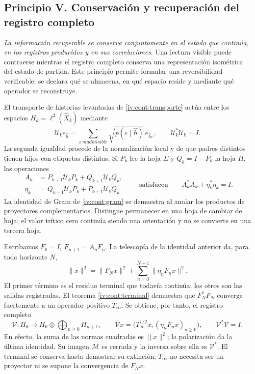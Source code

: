 \subsection*{Principio V. Conservación y recuperación del registro completo}
\hypertarget{prinh:conservacion}{}

\emph{La información recuperable se conserva conjuntamente en el estado
que continúa, en los registros producidos y en sus correlaciones.} Una
lectura visible puede contraerse mientras el registro completo conserva una
representación isométrica del estado de partida. Este principio permite
formular una reversibilidad verificable: se declara qué se almacena, en qué
espacio reside y mediante qué operador se reconstruye.

El transporte de historias levantadas de \cref{iv:cont:transporte} actúa
entre los espacios \(H_k=\ell^2(\widehat X_k)\) mediante
\[
 \mathcal U_ke_{\widehat h}=
 \sum_{\varepsilon\ {
m admisible}}
 \sqrt{p(\varepsilon\mid\widehat h)}\,
 e_{\widehat h\varepsilon},\qquad
 \mathcal U_k^*\mathcal U_k=I.
\]
La segunda igualdad procede de la normalización local y de que padres
distintos tienen hijos con etiquetas distintas. Si \(P_k\) lee la hoja
\(\Sigma\) y \(Q_k=I-P_k\) la hoja \(\Pi\), las operaciones
\[
 \begin{aligned}
 A_k&=P_{k+1}\mathcal U_kP_k+Q_{k+1}\mathcal U_kQ_k,\\
 \eta_k&=Q_{k+1}\mathcal U_kP_k+P_{k+1}\mathcal U_kQ_k
 \end{aligned}
 \qquad\text{satisfacen}\qquad A_k^*A_k+\eta_k^*\eta_k=I.
\]
La identidad de Gram de \cref{iv:cont:gram} se demuestra al anular los
productos de proyectores complementarios. Distingue permanecer en una
hoja de cambiar de hoja; el valor trítico cero continúa siendo una
orientación y no se convierte en una tercera hoja.

Escribamos \(F_0=I\), \(F_{n+1}=A_nF_n\). La telescopía de la
identidad anterior da, para todo horizonte \(N\),
\[
 \|x\|^2=\|F_Nx\|^2+
                 \sum_{n=0}^{N-1}\|\eta_nF_nx\|^2.
\]
El primer término es el residuo terminal que todavía continúa; los otros
son las salidas registradas. El teorema \cref{iv:cont:terminal} demuestra
que \(F_N^*F_N\) converge fuertemente a un operador positivo
\(T_\infty\). Se obtiene, por tanto, el registro completo
\[
 \mathcal V:H_0\longrightarrow H_0\oplus
                     \bigoplus_{n\geq0}H_{n+1},\qquad
 \mathcal Vx=\bigl(T_\infty^{1/2}x,
                         (\eta_nF_nx)_{n\geq0}\bigr),
 \qquad\mathcal V^*\mathcal V=I.
\]
En efecto, la suma de las normas cuadradas es \(\|x\|^2\); la
polarización da la última identidad. Su imagen \(\mathcal M\) es
cerrada y la inversa sobre ella es \(\mathcal V^*\). El terminal se
conserva hasta demostrar su extinción; \(T_\infty\) no necesita ser
un proyector ni se supone la convergencia de \(F_Nx\).

